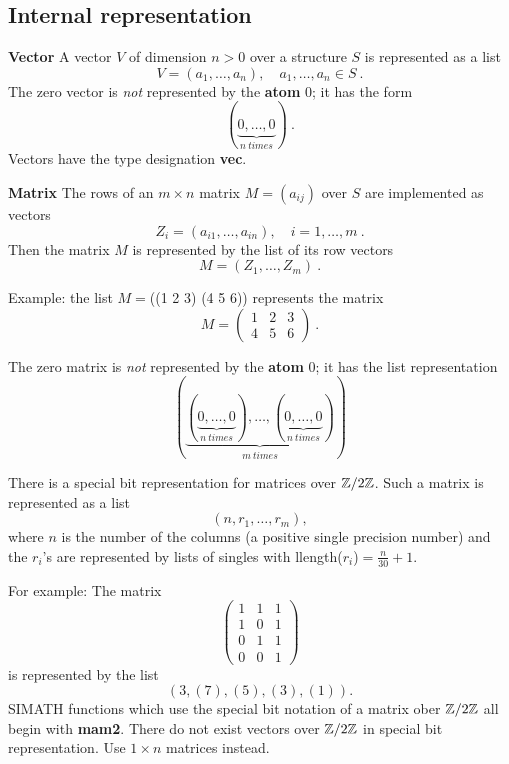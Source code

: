 \subsection{Internal representation}
{\bf Vector}
\leer
A vector $V$ of dimension $n>0$ over a structure $S$ is represented as a list
$$
     V = (a_1, \ldots, a_n), \quad  a_1,\ldots,a_n \in S\ . 
$$
The zero vector is {\em not\/} represented by the {\bf atom} $0$; it has the form 
$$
      (\underbrace{0,\ldots,0}_{n\ times}) \ .
$$
Vectors have the type designation {\bf vec}.

\leer
{\bf Matrix}
\leer
The rows of an $m \times n$ matrix $M=(a_{ij})$ over $S$ are implemented as vectors
$$
   Z_i = (a_{i1}, \ldots, a_{in}),\quad i = 1,\ldots,m\ .
$$
Then the matrix $M$ is represented by the list of its row vectors
$$
               M = (Z_1, \ldots, Z_m)\ .
$$ 

Example: the list $M =$((1 2 3) (4 5 6)) represents the matrix 
$$
M = 
      \left(
         \begin{array}{ccc}
            1 & 2 & 3 \\
            4 & 5 & 6 
         \end{array}
      \right)\ .
$$

\newpage

The zero matrix  is {\em not\/} represented by the {\bf atom} $0$; it has the list
representation
$$
(\underbrace{ (\underbrace{ 0,\ldots,0}_{n\ times}),\ldots,(\underbrace{0,\ldots,0}_{n\ times}) }_{m\ times})
$$

There is a special bit representation for matrices over $\mbox{$\mathbb Z$}/2\mbox{$\mathbb Z$}$. Such a matrix is represented as a list
$$
        (n, r_1,\ldots, r_m),
$$
where $n$ is the number of the columns (a positive single precision number) and
the $r_i$'s are 
represented by lists of singles with llength($r_i$)$ = \frac{n}{30}+1$.

For example: The matrix
$$ 
        \left(\begin{array}{ccc} 
                1 & 1 & 1 \\
                1 & 0 & 1 \\
                0 & 1 & 1 \\
                0 & 0 & 1 
        \end{array}\right)
$$ 
is represented by the list
$$
        (3, (7), (5), (3), (1)).
$$
SIMATH functions which use the special bit notation of a matrix ober $\mbox{$\mathbb Z$}/2\mbox{$\mathbb Z$}$
all begin with {\bf mam2}. There do not exist vectors over $\mbox{$\mathbb Z$}/2\mbox{$\mathbb Z$}$ in special
bit representation. Use $1\times n$ matrices instead.

